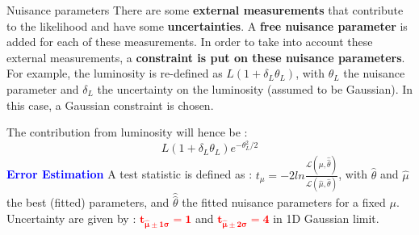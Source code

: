 
\begin{frame}{Nuisance parameters}
There are some {\bf external measurements}  that contribute to the likelihood and have some {\bf uncertainties}. 
A {\bf free nuisance parameter} is added for each of these measurements.
In order  to take into account these external measurements, a {\bf constraint is put on these nuisance parameters}. 
\vfill
For example, the luminosity is re-defined as  $L(1+\delta_L \theta_L)$, with $\theta_L$ the nuisance parameter and $\delta_L$ the uncertainty on the luminosity (assumed to be Gaussian).
In this case, a Gaussian constraint is chosen.

The contribution from luminosity will hence be :
$$L(1+\delta_L \theta_L)e^{-\theta_L^2/2}$$
\vfill
\textcolor{blue}{\bf Error Estimation}\newline
A test statistic is defined as : $t_\mu=-2ln\frac{\mathcal{L}(\mu,\hat{\hat{\theta}})}{\mathcal{L}(\hat{\mu},\hat{\theta})}$, with $\hat{\theta}$ and $\hat{\mu}$ the best (fitted) parameters, and $\hat{\hat{\theta}}$ the fitted nuisance parameters for a fixed $\mu$.\newline
Uncertainty are given by : \textcolor{red}{$\mathbf{t_{\hat{\mu}\pm 1\sigma}=1}$} and \textcolor{red}{$\mathbf{t_{\hat{\mu}\pm 2\sigma}=4}$} in 1D Gaussian limit.
\end{frame}

